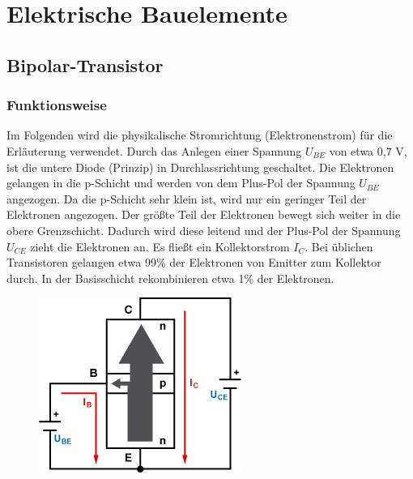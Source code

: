 				\begin{figure}[h]
					\centering
					 \hspace{0.4cm}
				\end{figure}

		
	
	\newpage
	\section{Elektrische Bauelemente}
		\subsection{Bipolar-Transistor}
			\subsubsection*{Funktionsweise}
				Im Folgenden wird die physikalische Stromrichtung (Elektronenstrom) für die Erläuterung verwendet. Durch das Anlegen einer Spannung $ U_{BE} $ von etwa 0,7 V, ist die untere Diode (Prinzip) in Durchlassrichtung geschaltet. Die Elektronen gelangen in die p-Schicht und werden von dem Plus-Pol der Spannung $ U_{BE} $ angezogen.
				Da die p-Schicht sehr klein ist, wird nur ein geringer Teil der Elektronen angezogen.
				Der größte Teil der Elektronen bewegt sich weiter in die obere Grenzschicht. Dadurch wird diese leitend und der Plus-Pol der Spannung $ U_{CE} $ zieht die Elektronen an. Es fließt ein Kollektorstrom $ I_{C} $.
				Bei üblichen Transistoren gelangen etwa 99\% der Elektronen von Emitter zum Kollektor durch. In der Basisschicht rekombinieren etwa 1\% der Elektronen.
				\begin{figure}[h]
					\centering
					\includegraphics[width=0.4\linewidth]{./pics/el/npn.png}
				\end{figure}
			
